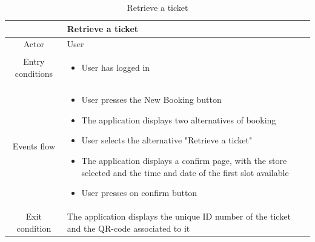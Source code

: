 \documentclass[table, 12pt]{article}
\begin{document}
\begin{minipage}{\textwidth}
    \begin{longtable}{|c| p{10cm}|}
        \caption{Retrieve a ticket}                                                                                                                                                                                                 \\
        \hline
                         & Retrieve a ticket                                                                                                                                                                                        \\
        \hline
        Actor            & User                                                                                                                                                                                                     \\
        \hline
        Entry conditions & \begin{itemize}
            \item User has logged in
        \end{itemize}                                                                                                                                                                               \\
        \hline
        Events flow      & \begin{itemize}[nosep,after=\strut]
            \item User presses the New Booking button
            \item The application displays two alternatives of booking
            \item User selects the alternative "Retrieve a ticket"
            \item The application displays a confirm page, with the store selected and the time and date of the first slot available
            \item User presses on confirm button
        \end{itemize}                                                                                                                                                                               \\
        \hline
        Exit condition   &
        The application displays the unique ID number of the ticket and the QR-code associated to it                                                                                                                                \\

\end{longtable}
\end{minipage}
\end{document}
